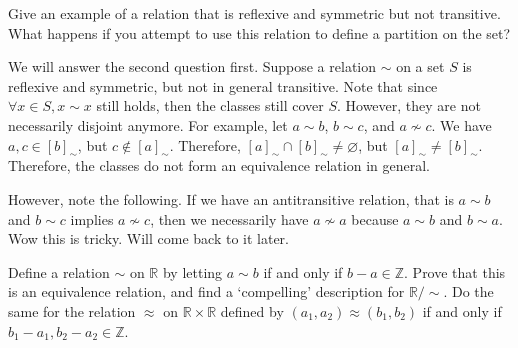 \documentclass[11pt]{report}
\newcommand{\tildesim}{\mathbin{\sim}}
\begin{document}
\begin{exercise}
	Give an example of a relation that is reflexive and symmetric but not transitive. What happens if you attempt to use this relation to define a partition on the set?
\end{exercise}
\begin{solution}
	We will answer the second question first. Suppose a relation $\sim $ on a set $S$ is reflexive and symmetric, but not in general transitive. Note that since $\forall x\in S,x\sim x$ still holds, then the classes still cover $S$. However, they are not necessarily disjoint anymore. For example, let $a\sim b$, $b\sim c$, and $a \nsim c$. We have $a,c\in[b]_\sim $, but $c\notin [a]_\sim $. Therefore, $[a]_\sim \cap [b]_\sim \neq \varnothing$, but $[a]_\sim \neq [b]_\sim $. Therefore, the classes do not form an equivalence relation in general.

	However, note the following. If we have an antitransitive relation, that is $a\sim b$ and $b\sim c$ implies $a\nsim c$, then we necessarily have $a\nsim a$ because $a\sim b$ and $b\sim a$. Wow this is tricky. Will come back to it later.
\end{solution}
\begin{exercise}
	Define a relation $\sim $ on $\mathbb{R}$ by letting $a\sim b$ if and only if $b-a\in\mathbb{Z}$. Prove that this is an equivalence relation, and find a `compelling' description for $\mathbb{R} /\tildesim $. Do the same for the relation $\approx $ on $\mathbb{R}\times \mathbb{R}$ defined by $(a_1,a_2)\approx (b_1,b_2)$ if and only if $b_1-a_1,b_2-a_2\in\mathbb{Z}$.
\end{exercise}
\end{document}
